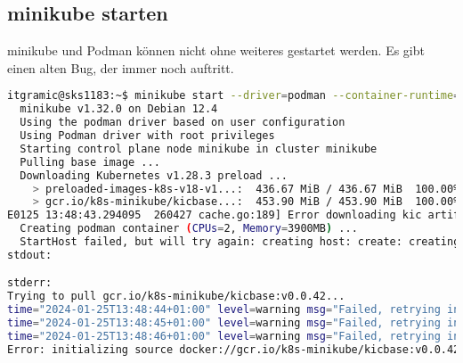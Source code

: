 \subsection{minikube starten}
minikube und Podman können nicht ohne weiteres gestartet werden.
Es gibt einen alten Bug, der immer noch auftritt\cite{8HWWRGUF}.
\begin{lstlisting}[language=bash, caption=minikube start issue,captionpos=b,label={lst:minikube-start-issue},breaklines=true]
itgramic@sks1183:~$ minikube start --driver=podman --container-runtime=cri-o
  minikube v1.32.0 on Debian 12.4
  Using the podman driver based on user configuration
  Using Podman driver with root privileges
  Starting control plane node minikube in cluster minikube
  Pulling base image ...
  Downloading Kubernetes v1.28.3 preload ...
    > preloaded-images-k8s-v18-v1...:  436.67 MiB / 436.67 MiB  100.00% 19.22 M
    > gcr.io/k8s-minikube/kicbase...:  453.90 MiB / 453.90 MiB  100.00% 12.52 M
E0125 13:48:43.294095  260427 cache.go:189] Error downloading kic artifacts:  not yet implemented, see issue #8426
  Creating podman container (CPUs=2, Memory=3900MB) ...
  StartHost failed, but will try again: creating host: create: creating: setting up container node: preparing volume for minikube container: sudo -n podman run --rm --name minikube-preload-sidecar --label created_by.minikube.sigs.k8s.io=true --label name.minikube.sigs.k8s.io=minikube --entrypoint /usr/bin/test -v minikube:/var gcr.io/k8s-minikube/kicbase:v0.0.42 -d /var/lib: exit status 125
stdout:

stderr:
Trying to pull gcr.io/k8s-minikube/kicbase:v0.0.42...
time="2024-01-25T13:48:44+01:00" level=warning msg="Failed, retrying in 1s ... (1/3). Error: initializing source docker://gcr.io/k8s-minikube/kicbase:v0.0.42: pinging container registry gcr.io: Get \"https://gcr.io/v2/\": dial tcp 142.251.18.82:443: connect: connection refused"
time="2024-01-25T13:48:45+01:00" level=warning msg="Failed, retrying in 1s ... (2/3). Error: initializing source docker://gcr.io/k8s-minikube/kicbase:v0.0.42: pinging container registry gcr.io: Get \"https://gcr.io/v2/\": dial tcp 142.251.18.82:443: connect: connection refused"
time="2024-01-25T13:48:46+01:00" level=warning msg="Failed, retrying in 1s ... (3/3). Error: initializing source docker://gcr.io/k8s-minikube/kicbase:v0.0.42: pinging container registry gcr.io: Get \"https://gcr.io/v2/\": dial tcp 142.251.18.82:443: connect: connection refused"
Error: initializing source docker://gcr.io/k8s-minikube/kicbase:v0.0.42: pinging container registry gcr.io: Get "https://gcr.io/v2/": dial tcp 142.251.18.82:443: connect: connection refused


\end{lstlisting}
